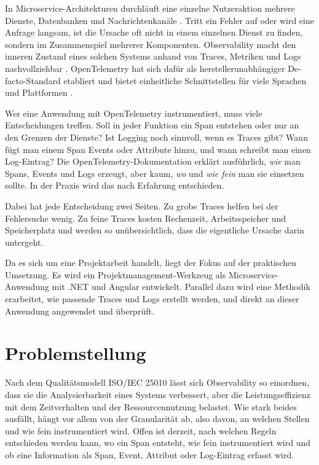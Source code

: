 \documentclass[11pt, a4paper]{article}
\begin{document}
In Microservice-Architekturen durchläuft eine einzelne Nutzeraktion mehrere Dienste, Datenbanken und Nachrichtenkanäle \cite{newman2021microservices}. Tritt ein Fehler auf oder wird eine Anfrage langsam, ist die Ursache oft nicht in einem einzelnen Dienst zu finden, sondern im Zusammenspiel mehrerer Komponenten. Observability macht den inneren Zustand eines solchen Systems anhand von Traces, Metriken und Logs nachvollziehbar \cite{majors2022observability}. OpenTelemetry hat sich dafür als herstellerunabhängiger De-facto-Standard etabliert und bietet einheitliche Schnittstellen für viele Sprachen und Plattformen \cite{otel_cncf,otel_docs}.

Wer eine Anwendung mit OpenTelemetry instrumentiert, muss viele Entscheidungen treffen. Soll in jeder Funktion ein Span entstehen oder nur an den Grenzen der Dienste? Ist Logging noch sinnvoll, wenn es Traces gibt? Wann fügt man einem Span Events oder Attribute hinzu, und wann schreibt man einen Log-Eintrag? Die OpenTelemetry-Dokumentation erklärt ausführlich, \emph{wie} man Spans, Events und Logs erzeugt, aber kaum, \emph{wo} und \emph{wie fein} man sie einsetzen sollte. In der Praxis wird das nach Erfahrung entschieden.

Dabei hat jede Entscheidung zwei Seiten. Zu grobe Traces helfen bei der Fehlersuche wenig. Zu feine Traces kosten Rechenzeit, Arbeitsspeicher und Speicherplatz und werden so unübersichtlich, dass die eigentliche Ursache darin untergeht.

Da es sich um eine Projektarbeit handelt, liegt der Fokus auf der praktischen Umsetzung. Es wird ein Projektmanagement-Werkzeug als Microservice-Anwendung mit .NET und Angular entwickelt. Parallel dazu wird eine Methodik erarbeitet, wie passende Traces und Logs erstellt werden, und direkt an dieser Anwendung angewendet und überprüft.

\section{Problemstellung}

Nach dem Qualitätsmodell ISO/IEC 25010 \cite{iso25010} lässt sich Observability so einordnen, dass sie die Analysierbarkeit eines Systems verbessert, aber die Leistungseffizienz mit dem Zeitverhalten und der Ressourcennutzung belastet. Wie stark beides ausfällt, hängt vor allem von der Granularität ab, also davon, an welchen Stellen und wie fein instrumentiert wird. Offen ist derzeit, nach welchen Regeln entschieden werden kann, wo ein Span entsteht, wie fein instrumentiert wird und ob eine Information als Span, Event, Attribut oder Log-Eintrag erfasst wird.
\end{document}
